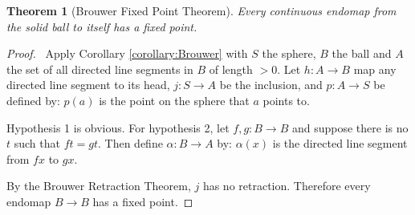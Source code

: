 \documentclass{article}
\let\qed\relax
\newtheorem{thm}[axiom]{Theorem}
\theoremstyle{definition}
\begin{document}
\begin{thm}[Brouwer Fixed Point Theorem]
    Every continuous endomap from the solid ball to itself has a fixed point.
\end{thm}

\begin{proof}
    \pf\ Apply Corollary \ref{corollary:Brouwer} with $S$ the sphere, $B$ the ball and $A$ the set of all
    directed line segments in $B$ of length $> 0$. Let $h : A \rightarrow B$ map any directed line segment to
    its head,
    $j : S \rightarrow A$ be the inclusion, and $p : A \rightarrow S$ be defined by: $p(a)$ is the point on
    the sphere that $a$ points to.

    Hypothesis 1 is obvious. For hypothesis 2, let $f, g : B \rightarrow B$ and suppose there is no $t$
    such that $ft = gt$. Then define $\alpha : B \rightarrow A$ by: $\alpha(x)$ is the directed line segment
    from $fx$ to $gx$.

    By the Brouwer Retraction Theorem, $j$ has no retraction. Therefore every endomap $B \rightarrow B$
    has a fixed point. \qed
\end{proof}
\end{document}
